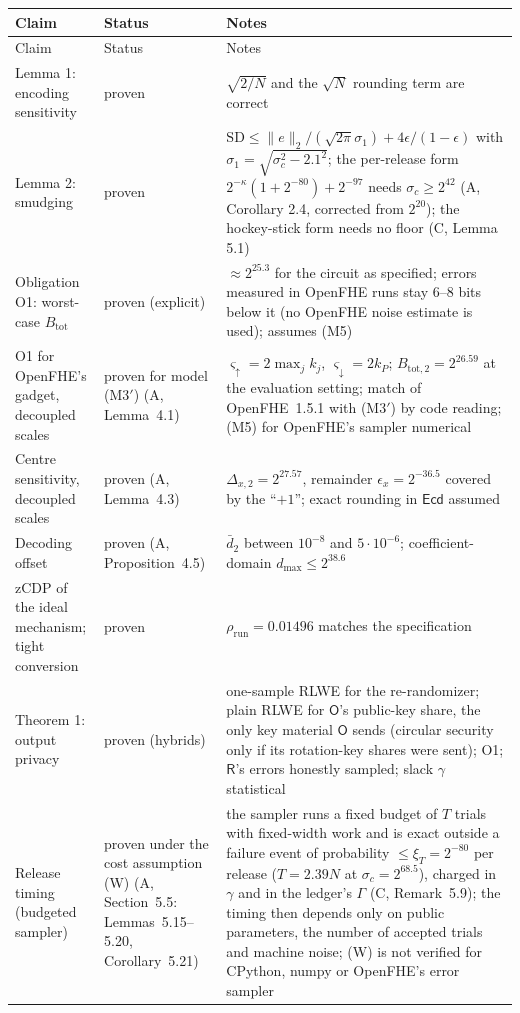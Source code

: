 \documentclass[11pt]{article}
\begin{document}
{\small
\begin{xltabular}{\textwidth}{@{}>{\raggedright\arraybackslash}p{3.9cm}>{\raggedright\arraybackslash}p{2.5cm}>{\raggedright\arraybackslash}X@{}}
\toprule
Claim & Status & Notes \\
\midrule
\endfirsthead
\toprule
Claim & Status & Notes \\
\midrule
\endhead
Lemma 1: encoding sensitivity & proven & $\sqrt{2/N}$ and the $\sqrt N$ rounding term are correct \\
Lemma 2: smudging & proven & $\mathrm{SD}\le\|e\|_2/(\sqrt{2\pi}\sigma_1)+4\epsilon/(1-\epsilon)$ with $\sigma_1=\sqrt{\sigma_c^2-2.1^2}$; the per-release form $2^{-\kappa}(1+2^{-80})+2^{-97}$ needs $\sigma_c\ge2^{42}$ (A, Corollary 2.4, corrected from $2^{20}$); the hockey-stick form needs no floor (C, Lemma 5.1) \\
Obligation O1: worst-case $B_{\mathrm{tot}}$ & proven (explicit) & $\approx2^{25.3}$ for the circuit as specified; errors measured in OpenFHE runs stay 6--8 bits below it (no OpenFHE noise estimate is used); assumes (M5) \\
O1 for OpenFHE's gadget, decoupled scales & proven for model (M3$'$) (A, Lemma~4.1) & $\varsigma_\uparrow=2\max_jk_j$, $\varsigma_\downarrow=2k_P$; $B_{\mathrm{tot},2}=2^{26.59}$ at the evaluation setting; match of OpenFHE~1.5.1 with (M3$'$) by code reading; (M5) for OpenFHE's sampler numerical \\
Centre sensitivity, decoupled scales & proven (A, Lemma~4.3) & $\Delta_{x,2}=2^{27.57}$, remainder $\epsilon_x=2^{-36.5}$ covered by the ``$+1$''; exact rounding in $\mathsf{Ecd}$ assumed \\
Decoding offset & proven (A, Proposition~4.5) & $\bar d_2$ between $10^{-8}$ and $5\cdot10^{-6}$; coefficient-domain $d_{\max}\le2^{38.6}$ \\
zCDP of the ideal mechanism; tight conversion & proven & $\rho_{\mathrm{run}}=0.01496$ matches the specification \\
Theorem 1: output privacy & proven (hybrids) & one-sample RLWE for the re-randomizer; plain RLWE for $\mathsf O$'s public-key share, the only key material $\mathsf O$ sends (circular security only if its rotation-key shares were sent); O1; $\mathsf R$'s errors honestly sampled; slack $\gamma$ statistical \\
Release timing (budgeted sampler) & proven under the cost assumption (W) (A, Section~5.5: Lemmas~5.15--5.20, Corollary~5.21) & the sampler runs a fixed budget of $T$ trials with fixed-width work and is exact outside a failure event of probability $\le\xi_T=2^{-80}$ per release ($T=2.39N$ at $\sigma_c=2^{68.5}$), charged in $\gamma$ and in the ledger's $\Gamma$ (C, Remark~5.9); the timing then depends only on public parameters, the number of accepted trials and machine noise; (W) is not verified for CPython, numpy or OpenFHE's error sampler \\

\end{xltabular}}
\end{document}
